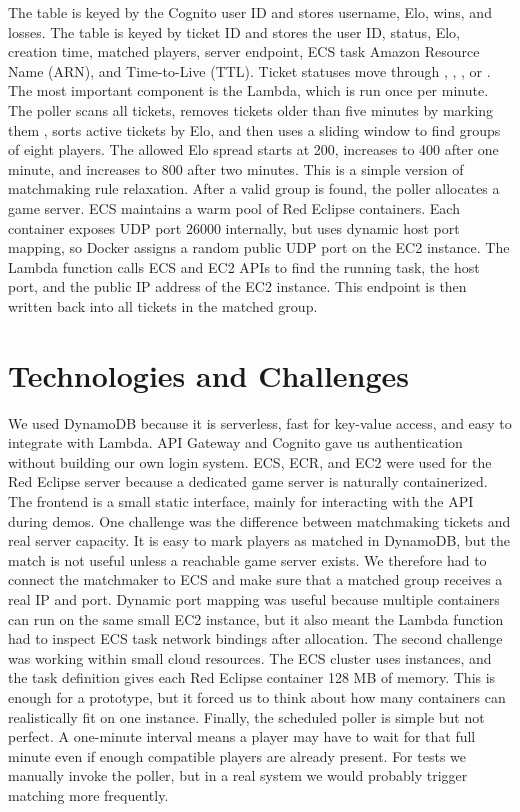 \documentclass[9pt,a4paper,twocolumn,twoside]{tau-class/tau}
\begin{document}
    The  table is keyed by the Cognito user ID and stores username, Elo, wins, and losses. The  table is keyed by ticket ID and stores the user ID, status, Elo, creation time, matched players, server endpoint, ECS task Amazon Resource Name (ARN), and Time-to-Live (TTL). Ticket statuses move through , , , or .
    The most important component is the  Lambda, which is run once per minute. The poller scans all  tickets, removes tickets older than five minutes by marking them , sorts active tickets by Elo, and then uses a sliding window to find groups of eight players. The allowed Elo spread starts at 200, increases to 400 after one minute, and increases to 800 after two minutes. This is a simple version of matchmaking rule relaxation.
    After a valid group is found, the poller allocates a game server. ECS maintains a warm pool of Red Eclipse containers. Each container exposes UDP port 26000 internally, but uses dynamic host port mapping, so Docker assigns a random public UDP port on the EC2 instance. The Lambda function calls ECS and EC2 APIs to find the running task, the host port, and the public IP address of the EC2 instance. This endpoint is then written back into all tickets in the matched group.

\section{Technologies and Challenges}

    We used DynamoDB because it is serverless, fast for key-value access, and easy to integrate with Lambda. API Gateway and Cognito gave us authentication without building our own login system. ECS, ECR, and EC2 were used for the Red Eclipse server because a dedicated game server is naturally containerized. The frontend is a small static interface, mainly for interacting with the API during demos.
    One challenge was the difference between matchmaking tickets and real server capacity. It is easy to mark players as matched in DynamoDB, but the match is not useful unless a reachable game server exists. We therefore had to connect the matchmaker to ECS and make sure that a matched group receives a real IP and port. Dynamic port mapping was useful because multiple containers can run on the same small EC2 instance, but it also meant the Lambda function had to inspect ECS task network bindings after allocation.
    The second challenge was working within small cloud resources. The ECS cluster uses  instances, and the task definition gives each Red Eclipse container 128 MB of memory. This is enough for a prototype, but it forced us to think about how many containers can realistically fit on one instance. 
    Finally, the scheduled poller is simple but not perfect. A one-minute interval means a player may have to wait for that full minute even if enough compatible players are already present. For tests we manually invoke the poller, but in a real system we would probably trigger matching more frequently.
\end{document}
